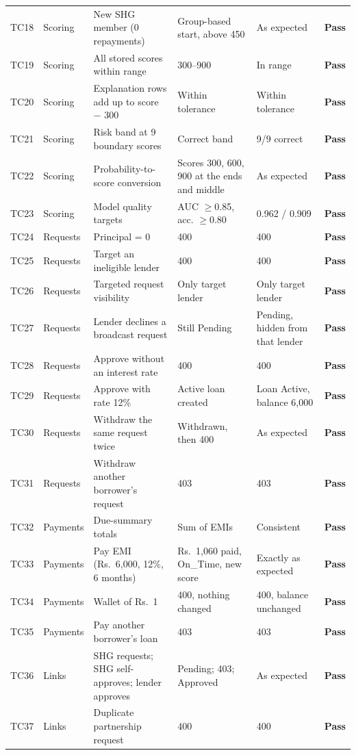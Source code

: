 \documentclass[11pt,a4paper]{article}
\newcommand{\pass}{\textbf{Pass}}
\begin{document}
\begin{longtable}{@{}lL{1.95cm}L{4.3cm}L{2.9cm}L{2.5cm}l@{}}
TC18 & Scoring & New SHG member (0 repayments) & Group-based start, above 450 & As expected & \pass\\
TC19 & Scoring & All stored scores within range & 300--900 & In range & \pass\\
TC20 & Scoring & Explanation rows add up to score $-$ 300 & Within tolerance & Within tolerance & \pass\\
TC21 & Scoring & Risk band at 9 boundary scores & Correct band & 9/9 correct & \pass\\
TC22 & Scoring & Probability-to-score conversion & Scores 300, 600, 900 at the ends and middle & As expected & \pass\\
TC23 & Scoring & Model quality targets & AUC $\ge$0.85, acc. $\ge$0.80 & 0.962 / 0.909 & \pass\\
TC24 & Requests & Principal = 0 & 400 & 400 & \pass\\
TC25 & Requests & Target an ineligible lender & 400 & 400 & \pass\\
TC26 & Requests & Targeted request visibility & Only target lender & Only target lender & \pass\\
TC27 & Requests & Lender declines a broadcast request & Still Pending & Pending, hidden from that lender & \pass\\
TC28 & Requests & Approve without an interest rate & 400 & 400 & \pass\\
TC29 & Requests & Approve with rate 12\% & Active loan created & Loan Active, balance 6{,}000 & \pass\\
TC30 & Requests & Withdraw the same request twice & Withdrawn, then 400 & As expected & \pass\\
TC31 & Requests & Withdraw another borrower's request & 403 & 403 & \pass\\
TC32 & Payments & Due-summary totals & Sum of EMIs & Consistent & \pass\\
TC33 & Payments & Pay EMI (Rs.~6{,}000, 12\%, 6 months) & Rs.~1{,}060 paid, On\_Time, new score & Exactly as expected & \pass\\
TC34 & Payments & Wallet of Rs.~1 & 400, nothing changed & 400, balance unchanged & \pass\\
TC35 & Payments & Pay another borrower's loan & 403 & 403 & \pass\\
TC36 & Links & SHG requests; SHG self-approves; lender approves & Pending; 403; Approved & As expected & \pass\\
TC37 & Links & Duplicate partnership request & 400 & 400 & \pass\\

\end{longtable}
\end{document}
